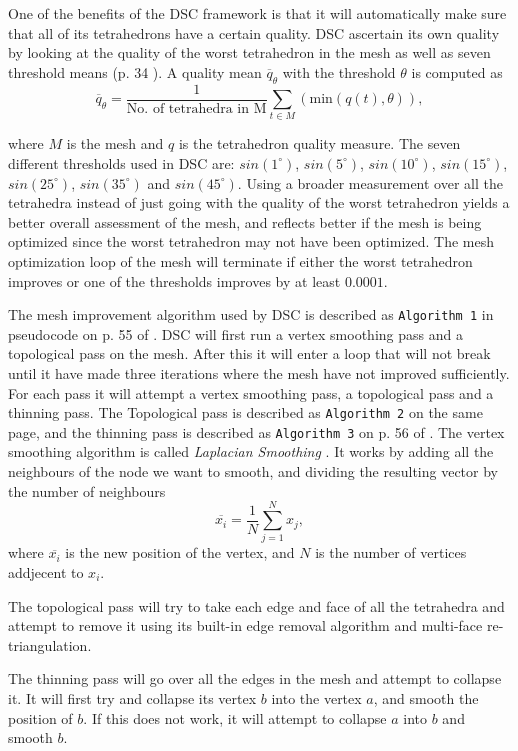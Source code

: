 One of the benefits of the DSC framework is that it will automatically make
sure that all of its tetrahedrons have a certain quality. DSC ascertain its own
quality by looking at the quality of the worst tetrahedron in the mesh as well
as seven threshold means (p. 34 \cite{DSC10}). A quality mean
$\overline{q}_\theta$ with the threshold $\theta$ is computed as
\[
  \overline{q}_\theta = \frac{1}{\text{No. of tetrahedra in M}}
  \sum_{t \in M}^{}(\text{min}(q(t),\theta)),
\]

where $M$ is the mesh and $q$ is the tetrahedron quality measure. The seven
different thresholds used in DSC are: $sin(1^\circ)$, $sin(5^\circ)$,
$sin(10^\circ)$, $sin(15^\circ)$, $sin(25^\circ)$, $sin(35^\circ)$ and
$sin(45^\circ)$. Using a broader measurement over all the tetrahedra instead of
just going with the quality of the worst tetrahedron yields a better overall
assessment of the mesh, and reflects better if the mesh is being optimized since
the worst tetrahedron may not have been optimized. The mesh optimization loop
of the mesh will terminate if either the worst tetrahedron improves or one of
the thresholds improves by at least $0.0001$.

The mesh improvement algorithm used by DSC is described as \texttt{Algorithm 1}
in pseudocode on p. 55 of \cite{DSC10}. DSC will first run a vertex smoothing
pass and a topological pass on the mesh. After this it will enter a loop that
will not break until it have made three iterations where the mesh have not improved
sufficiently. For each pass it will attempt a vertex smoothing pass, a
topological pass and a thinning pass. The Topological pass is described as
\texttt{Algorithm 2} on the same page, and the thinning pass is described as
\texttt{Algorithm 3} on p. 56 of \cite{DSC10}. The vertex smoothing algorithm
is called \textit{Laplacian Smoothing} \cite{wikils}. It works by adding all
the neighbours of the node we want to smooth, and dividing the resulting vector
by the number of neighbours
\[
  \overline{x_i} = \frac{1}{N}\sum_{j=1}^{N}x_j,
\]
where $\overline{x_i}$ is the new position of the vertex, and $N$ is the number
of vertices addjecent to $x_i$.

The topological pass will try to take each edge and face of all the tetrahedra
and attempt to remove it using its built-in edge removal algorithm and
multi-face re-triangulation.

The thinning pass will go over all the edges in the mesh and attempt to collapse
it. It will first try and collapse its vertex $b$ into the vertex $a$, and
smooth the position of $b$. If this does not work, it will attempt to collapse
$a$ into $b$ and smooth $b$.